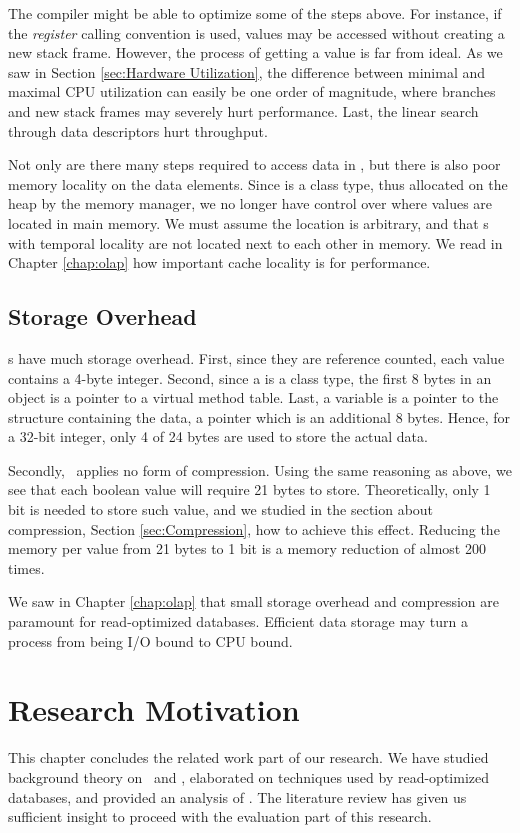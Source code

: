 The compiler might be able to optimize some of the steps above. For instance, if the \textit{register} calling convention is used, values may be accessed without creating a new stack frame. However, the process of getting a value is far from ideal. As we saw in Section \ref{sec:Hardware Utilization}, the difference between minimal and maximal CPU utilization can easily be one order of magnitude, where branches and new stack frames may severely hurt performance. Last, the linear search through data descriptors hurt throughput.

Not only are there many steps required to access data in \gap, but there is also poor memory locality on the data elements. Since  is a class type, thus allocated on the heap by the memory manager, we no longer have control over where values are located in main memory. We must assume the location is arbitrary, and that s with temporal locality are not located next to each other in memory. We read in Chapter \ref{chap:olap} how important cache locality is for performance.

\subsection{Storage Overhead}
\label{sub:Storage Overhead}
s have much storage overhead. First, since they are reference counted, each value contains a 4-byte integer. Second, since a  is a class type, the first 8 bytes in an object is a pointer to a virtual method table. Last, a  variable is a pointer to the structure containing the data, a pointer which is an additional 8 bytes. Hence, for a 32-bit integer, only 4 of 24 bytes are used to store the actual data. 

Secondly, \gap~applies no form of compression. Using the same reasoning as above, we see that each boolean value will require 21 bytes to store. Theoretically, only 1 bit is needed to store such value, and we studied in the section about compression, Section \ref{sec:Compression}, how to achieve this effect. Reducing the memory per value from 21 bytes to 1 bit is a memory reduction of almost 200 times.

We saw in Chapter \ref{chap:olap} that small storage overhead and compression are paramount for read-optimized databases. Efficient data storage may turn a process from being I/O bound to CPU bound.

\section{Research Motivation}
\label{sec:Research Motivation}
This chapter concludes the related work part of our research. We have studied background theory on \mde~and \bi, elaborated on techniques used by read-optimized databases, and provided an analysis of \gap. The literature review has given us sufficient insight to proceed with the evaluation part of this research. 


